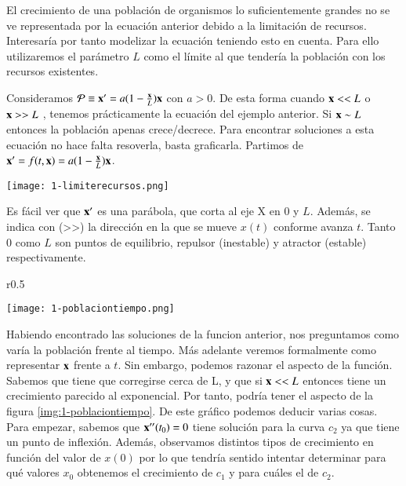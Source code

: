 El crecimiento de una población de organismos lo suficientemente grandes no se ve representada por la ecuación anterior debido a la limitación de recursos. Interesaría por tanto modelizar la ecuación teniendo esto en cuenta. Para ello utilizaremos el parámetro $L$ como el límite al que tendería la población con los recursos existentes.

\begin{eg}
    Consideramos $\mathcal{P} \equiv \mathbf{x'} = a(1-\frac{\mathbf{x}}{L})\mathbf{x}$ con $a > 0$. De esta forma cuando $\mathbf{x} << L$ o $\mathbf{x} >> L$ , tenemos prácticamente la ecuación del ejemplo anterior. Si $\mathbf{x} \sim L$ entonces la población apenas crece/decrece. Para encontrar soluciones a esta ecuación no hace falta resoverla, basta graficarla. Partimos de $\mathbf{x'} = f(t, \mathbf{x}) = a (1 - \frac{\mathbf{x}}{L})\mathbf{x}$.
    \\
    \begin{center}
        \texttt{[image: 1-limiterecursos.png]}\label{img:1-limiterecursos}
    \end{center}
    Es fácil ver que $\mathbf{x'}$ es una parábola, que corta al eje X en $0$ y $L$. Además, se indica con (>>) la dirección en la que se mueve $x(t)$ conforme avanza $t$. Tanto $0$ como $L$ son puntos de equilibrio, repulsor (inestable) y atractor (estable) respectivamente.
\end{eg}
\break

\begin{wrapfigure}{r}{0.5\textwidth}
  \begin{center}
    \texttt{[image: 1-poblaciontiempo.png]}
  \end{center}
  \caption{Población - Tiempo}\label{img:1-poblaciontiempo}
\end{wrapfigure}
Habiendo encontrado las soluciones de la funcion anterior, nos preguntamos como varía la población frente al tiempo. Más adelante veremos formalmente como representar $\mathbf{x}$ frente a $t$. Sin embargo, podemos razonar el aspecto de la función.
Sabemos que tiene que corregirse cerca de L, y que si $\mathbf{x} << L$ entonces tiene un crecimiento parecido al exponencial. Por tanto, podría tener el aspecto de la figura \ref{img:1-poblaciontiempo}.
De este gráfico podemos deducir varias cosas. Para empezar, sabemos que $\mathbf{x''}(t_0)=0$ tiene solución para la curva $c_2$ ya que tiene un punto de inflexión. Además, observamos distintos tipos de crecimiento en función del valor de $x(0)$ por lo que tendría sentido intentar determinar para qué valores $x_0$ obtenemos el crecimiento de $c_1$ y para cuáles el de $c_2$.


